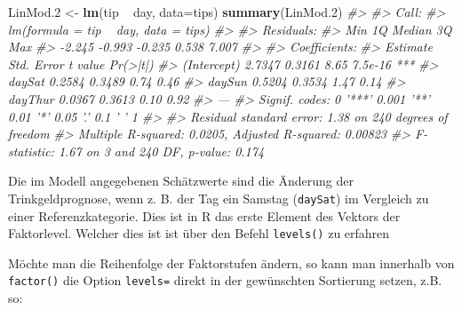 \documentclass[12pt,ngerman,]{book}
\makeatletter
\newenvironment{Shaded}{\begin{snugshade}}{\end{snugshade}}
\newcommand{\KeywordTok}[1]{\textcolor[rgb]{0.13,0.29,0.53}{\textbf{{#1}}}}
\newcommand{\DataTypeTok}[1]{\textcolor[rgb]{0.13,0.29,0.53}{{#1}}}
\newcommand{\FloatTok}[1]{\textcolor[rgb]{0.00,0.00,0.81}{{#1}}}
\newcommand{\StringTok}[1]{\textcolor[rgb]{0.31,0.60,0.02}{{#1}}}
\newcommand{\CommentTok}[1]{\textcolor[rgb]{0.56,0.35,0.01}{\textit{{#1}}}}
\newcommand{\NormalTok}[1]{{#1}}
\newenvironment{kframe}{%
\medskip{}
\setlength{\fboxsep}{.8em}
 \def\at@end@of@kframe{}%
 \ifinner\ifhmode%
  \def\at@end@of@kframe{\end{minipage}}%
  \begin{minipage}{\columnwidth}%
 \fi\fi%
 \def\FrameCommand##1{\hskip\@totalleftmargin \hskip-\fboxsep
 \colorbox{shadecolor}{##1}\hskip-\fboxsep
     \hskip-\linewidth \hskip-\@totalleftmargin \hskip\columnwidth}%
 \MakeFramed {\advance\hsize-\width
   \@totalleftmargin\z@ \linewidth\hsize
   \@setminipage}}%
 {\par\unskip\endMakeFramed%
 \at@end@of@kframe}
\renewenvironment{Shaded}{\begin{kframe}}{\end{kframe}}
\makeatother
\begin{document}
\begin{Shaded}
\begin{Highlighting}[]
\NormalTok{LinMod}\FloatTok{.2} \NormalTok{<-}\StringTok{ }\KeywordTok{lm}\NormalTok{(tip ~}\StringTok{ }\NormalTok{day, }\DataTypeTok{data=}\NormalTok{tips)}
\KeywordTok{summary}\NormalTok{(LinMod}\FloatTok{.2}\NormalTok{)}
\CommentTok{#> }
\CommentTok{#> Call:}
\CommentTok{#> lm(formula = tip ~ day, data = tips)}
\CommentTok{#> }
\CommentTok{#> Residuals:}
\CommentTok{#>    Min     1Q Median     3Q    Max }
\CommentTok{#> -2.245 -0.993 -0.235  0.538  7.007 }
\CommentTok{#> }
\CommentTok{#> Coefficients:}
\CommentTok{#>             Estimate Std. Error t value Pr(>|t|)    }
\CommentTok{#> (Intercept)   2.7347     0.3161    8.65  7.5e-16 ***}
\CommentTok{#> daySat        0.2584     0.3489    0.74     0.46    }
\CommentTok{#> daySun        0.5204     0.3534    1.47     0.14    }
\CommentTok{#> dayThur       0.0367     0.3613    0.10     0.92    }
\CommentTok{#> ---}
\CommentTok{#> Signif. codes:  0 '***' 0.001 '**' 0.01 '*' 0.05 '.' 0.1 ' ' 1}
\CommentTok{#> }
\CommentTok{#> Residual standard error: 1.38 on 240 degrees of freedom}
\CommentTok{#> Multiple R-squared:  0.0205, Adjusted R-squared:  0.00823 }
\CommentTok{#> F-statistic: 1.67 on 3 and 240 DF,  p-value: 0.174}
\end{Highlighting}
\end{Shaded}

Die im Modell angegebenen Schätzwerte sind die Änderung der
Trinkgeldprognose, wenn z. B. der Tag ein Samstag (\texttt{daySat}) im
Vergleich zu einer Referenzkategorie. Dies ist in R das erste Element
des Vektors der Faktorlevel. Welcher dies ist ist über den Befehl
\texttt{levels()} zu erfahren

\begin{Shaded}
\end{Shaded}

Möchte man die Reihenfolge der Faktorstufen ändern, so kann man
innerhalb von \texttt{factor()} die Option \texttt{levels=} direkt in
der gewünschten Sortierung setzen, z.B. so:

\begin{Shaded}
\end{Shaded}
\end{document}
